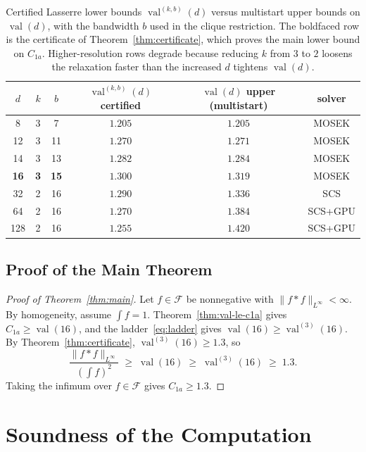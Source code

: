 \documentclass[11pt, letterpaper]{article}
\theoremstyle{paperplain}
\theoremstyle{paperdef}
\newcommand{\val}{\operatorname{val}}
\begin{document}
\begin{table}[t]
\centering
\small
\begin{tabular}{cccccc}
  \toprule
  $d$ & $k$ & $b$ & $\val^{(k,b)}(d)$ certified
      & $\val(d)$ upper (multistart) & solver \\
  \midrule
   8 & 3 & 7    & $1.205$ & $1.205$ & MOSEK\\
  12 & 3 & 11   & $1.270$ & $1.271$ & MOSEK\\
  14 & 3 & 13   & $1.282$ & $1.284$ & MOSEK\\
  \textbf{16} & \textbf{3} & \textbf{15} & $\boldsymbol{1.300}$ & $1.319$ & MOSEK\\
  32 & 2 & 16   & $1.290$ & $1.336$ & SCS\\
  64 & 2 & 16   & $1.270$ & $1.384$ & SCS+GPU\\
 128 & 2 & 16   & $1.255$ & $1.420$ & SCS+GPU\\
  \bottomrule
\end{tabular}
\caption[Certified Lasserre lower bounds versus multistart upper bounds.]{Certified Lasserre lower bounds $\val^{(k,b)}(d)$ versus
multistart upper bounds on $\val(d)$, with the bandwidth $b$ used in
the clique restriction.  The boldfaced row is the certificate of
Theorem~\ref{thm:certificate}, which proves the main lower bound on
$C_{1a}$.  Higher-resolution rows degrade because reducing $k$ from
$3$ to $2$ loosens the relaxation faster than the increased $d$ tightens
$\val(d)$.}
\label{tab:numerical}
\end{table}

\subsection{Proof of the Main Theorem}

\begin{proof}[Proof of Theorem~\ref{thm:main}]
Let $f\in\mathcal{F}$ be nonnegative with $\|f*f\|_{L^\infty}<\infty$.
By homogeneity, assume $\int f = 1$.  Theorem~\ref{thm:val-le-c1a}
gives $C_{1a}\ge \val(16)$, and the ladder~\eqref{eq:ladder} gives
$\val(16)\ge \val^{(3)}(16)$.  By
Theorem~\ref{thm:certificate}, $\val^{(3)}(16)\ge 1.3$, so
\[
  \frac{\|f*f\|_{L^\infty}}{\left(\int f\right)^2}
  \;\ge\;
  \val(16)
  \;\ge\;
  \val^{(3)}(16)
  \;\ge\;
  1.3.
\]
Taking the infimum over $f\in\mathcal{F}$ gives $C_{1a}\ge 1.3$.
\end{proof}


\section{Soundness of the Computation}\label{sec:correctness}
\end{document}
